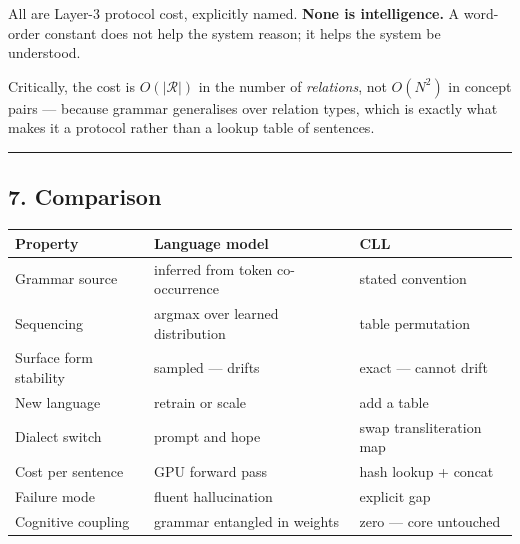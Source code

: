 \documentclass[
  11pt,
  a4paper,
]{article}
\begin{document}
All are Layer-3 protocol cost, explicitly named. \textbf{None is
intelligence.} A word-order constant does not help the system reason; it
helps the system be understood.

Critically, the cost is \(O(|\mathcal{R}|)\) in the number of
\emph{relations}, not \(O(N^2)\) in concept pairs --- because grammar
generalises over relation types, which is exactly what makes it a
protocol rather than a lookup table of sentences.

\begin{center}\rule{0.5\linewidth}{0.5pt}\end{center}

\subsection{7. Comparison}\label{comparison}

\begin{longtable}[]{@{}
  >{\raggedright\arraybackslash}p{}
  >{\raggedright\arraybackslash}p{}
  >{\raggedright\arraybackslash}p{}@{}}
\toprule\noalign{}
\begin{minipage}[b]{\linewidth}\raggedright
Property
\end{minipage} & \begin{minipage}[b]{\linewidth}\raggedright
Language model
\end{minipage} & \begin{minipage}[b]{\linewidth}\raggedright
CLL
\end{minipage} \\
\midrule\noalign{}
\endhead
\bottomrule\noalign{}
\endlastfoot
Grammar source & inferred from token co-occurrence & stated
convention \\
Sequencing & argmax over learned distribution & table permutation \\
Surface form stability & sampled --- drifts & exact --- cannot drift \\
New language & retrain or scale & add a table \\
Dialect switch & prompt and hope & swap transliteration map \\
Cost per sentence & GPU forward pass & hash lookup + concat \\
Failure mode & fluent hallucination & explicit gap \\
Cognitive coupling & grammar entangled in weights & zero --- core
untouched \\
\end{longtable}
\end{document}
